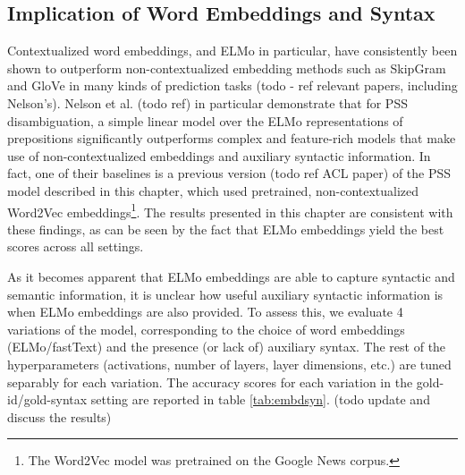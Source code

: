 \subsection{Implication of Word Embeddings and Syntax}

Contextualized word embeddings, and ELMo in particular, have consistently been shown to outperform non-contextualized embedding methods such as SkipGram and GloVe in many kinds of prediction tasks (todo - ref relevant papers, including Nelson's). Nelson et al. (todo ref) in particular demonstrate that for PSS disambiguation, a simple linear model over the ELMo representations of prepositions significantly outperforms complex and feature-rich models that make use of non-contextualized embeddings and auxiliary syntactic information. In fact, one of their baselines is a previous version (todo ref ACL paper) of the PSS model described in this chapter, which used pretrained, non-contextualized  Word2Vec  embeddings\footnote{The Word2Vec model was pretrained on the Google News corpus.}. The results presented in this chapter are consistent with these findings, as can be seen by the fact that ELMo embeddings yield the best scores across all settings.

As it becomes apparent that ELMo embeddings are able to capture syntactic and semantic information, it is unclear how useful auxiliary syntactic information is when ELMo embeddings are also provided. To assess this, we evaluate 4 variations of the model, corresponding to the choice of word embeddings (ELMo/fastText) and the presence (or lack of) auxiliary syntax. The rest of the hyperparameters (activations, number of layers, layer dimensions, etc.) are tuned separably for each variation. The accuracy scores for each variation in the gold-id/gold-syntax setting are reported in table \ref{tab:embdsyn}. (todo update and discuss the results)

